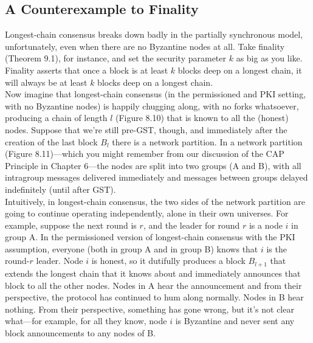 \subsection{A Counterexample to Finality}
Longest-chain consensus breaks down badly in the partially synchronous model, unfortunately, even when there are no Byzantine nodes at all. Take finality (Theorem 9.1), for
instance, and set the security parameter $k$ as big as you like. Finality asserts that once a
block is at least $k$ blocks deep on a longest chain, it will always be at least $k$ blocks deep on
a longest chain.\\
Now imagine that longest-chain consensus (in the permissioned and PKI setting, with
no Byzantine nodes) is happily chugging along, with no forks whatsoever, producing a chain
of length $l$ (Figure 8.10) that is known to all the (honest) nodes. Suppose that we’re still
pre-GST, though, and immediately after the creation of the last block $B_l$ there is a network
partition. In a network partition (Figure 8.11)—which you might remember from our discussion of the CAP Principle in Chapter 6—the nodes are split into two groups (A and B),
with all intragroup messages delivered immediately and messages between groups delayed
indefinitely (until after GST).\\
Intuitively, in longest-chain consensus, the two sides of the network partition are going
to continue operating independently, alone in their own universes. For example, suppose
the next round is $r$, and the leader for round $r$ is a node $i$ in group A. In the permissioned
version of longest-chain consensus with the PKI assumption, everyone (both in group A and
in group B) knows that $i$ is the round-$r$ leader. Node $i$ is honest, so it dutifully produces a
block $B_{l+1}$ that extends the longest chain that it knows about and immediately announces
that block to all the other nodes. Nodes in A hear the announcement and from their
perspective, the protocol has continued to hum along normally. Nodes in B hear nothing.
From their perspective, something has gone wrong, but it’s not clear what—for example, for
all they know, node $i$ is Byzantine and never sent any block announcements to any nodes
of B.

